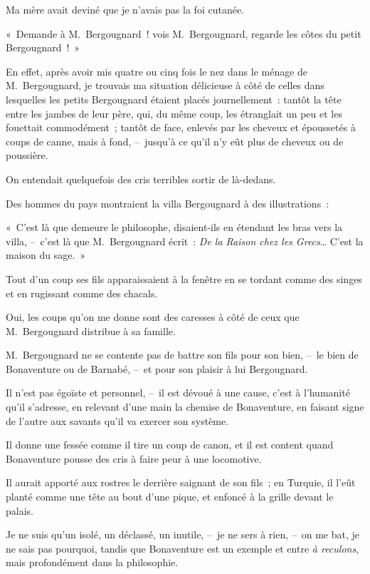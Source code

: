 \documentclass[french,twoside]{book} %
\begin{document}
Ma mère avait deviné que je n’avais pas la foi cutanée.\par
« Demande à M. Bergougnard ! vois M. Bergougnard, regarde les côtes du petit Bergougnard ! »\par
En effet, après avoir mis quatre ou cinq fois le nez dans le ménage de M. Bergougnard, je trouvais ma situation délicieuse à côté de celles dans lesquelles les petits Bergougnard étaient placés journellement : tantôt la tête entre les jambes de leur père, qui, du même coup, les étranglait un peu et les fouettait commodément ; tantôt de face, enlevés par les cheveux et époussetés à coups de canne, mais à fond, – jusqu’à ce qu’il n’y eût plus de cheveux ou de poussière.\par
On entendait quelquefois des cris terribles sortir de là-dedans.\par
Des hommes du pays montraient la villa Bergougnard à des illustrations :\par
« C’est là que demeure le philosophe, disaient-ils en étendant les bras vers la villa, – c’est là que M. Bergougnard écrit : \emph{De la Raison chez les Grecs}… C’est la maison du sage. »\par
Tout d’un coup ses fils apparaissaient à la fenêtre en se tordant comme des singes et en rugissant comme des chacals.\par
\bigbreak
\noindent Oui, les coups qu’on me donne sont des caresses à côté de ceux que M. Bergougnard distribue à sa famille.\par
M. Bergougnard ne se contente pas de battre son fils pour son bien, – le bien de Bonaventure ou de Barnabé, – et pour son plaisir à lui Bergougnard.\par
Il n’est pas égoïste et personnel, – il est dévoué à une cause, c’est à l’humanité qu’il s’adresse, en relevant d’une main la chemise de Bonaventure, en faisant signe de l’autre aux savants qu’il va exercer son système.\par
Il donne une fessée comme il tire un coup de canon, et il est content quand Bonaventure pousse des cris à faire peur à une locomotive.\par
Il aurait apporté aux rostres le derrière saignant de son fils ; en Turquie, il l’eût planté comme une tête au bout d’une pique, et enfoncé à la grille devant le palais.\par
\bigbreak
\noindent Je ne suis qu’un isolé, un déclassé, un inutile, – je ne sers à rien, – on me bat, je ne sais pas pourquoi, tandis que Bonaventure est un exemple et entre \emph{à reculons}, mais profondément dans la philosophie.\par
\end{document}
